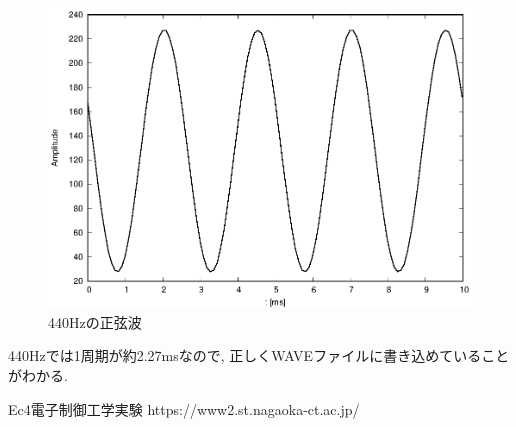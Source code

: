 \documentclass[titlepage]{jsarticle}
\begin{document}
            \begin{figure}[ht]
                \centering
                \includegraphics[width=12cm]{images/440.eps}
                \caption{440Hzの正弦波}
                \label{fig:440}
            \end{figure}

            440Hzでは1周期が約2.27msなので, 正しくWAVEファイルに書き込めていることがわかる.

\begin{thebibliography}{99}
     Ec4電子制御工学実験 https://www2.st.nagaoka-ct.ac.jp/
\end{thebibliography}
\end{document}
